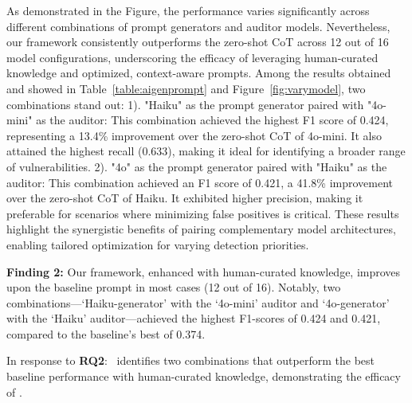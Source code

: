 As demonstrated in the Figure, the performance varies significantly across different combinations of prompt generators and auditor models.
Nevertheless, our framework consistently outperforms the zero-shot CoT across 12 out of 16 model configurations, underscoring the efficacy of leveraging human-curated knowledge and optimized, context-aware prompts. 
Among the results obtained and showed in Table~\ref{table:aigenprompt} and Figure~\ref{fig:varymodel}, two combinations stand out: 1). "Haiku" as the prompt generator paired with "4o-mini" as the auditor: This combination achieved the highest F1 score of 0.424, representing a 13.4\% improvement over the zero-shot CoT of 4o-mini. It also attained the highest recall (0.633), making it ideal for identifying a broader range of vulnerabilities.
2). "4o" as the prompt generator paired with "Haiku" as the auditor: This combination achieved an F1 score of 0.421, a 41.8\% improvement over the zero-shot CoT of Haiku. It exhibited higher precision, making it preferable for scenarios where minimizing false positives is critical.
These results highlight the synergistic benefits of pairing complementary model architectures, enabling tailored optimization for varying detection priorities.



\begin{tcolorbox}[colback=gray!20!white, colframe=gray!75!black, boxsep=5pt, arc=4pt, boxrule=1pt, left=0pt, right=0pt]
\textbf{Finding 2:} 
Our framework, enhanced with human-curated knowledge, improves upon the baseline prompt in most cases (12 out of 16). Notably, two combinations—‘Haiku-generator’ with the ‘4o-mini’ auditor and ‘4o-generator’ with the ‘Haiku’ auditor—achieved the highest F1-scores of 0.424 and 0.421, compared to the baseline's best of 0.374.
\end{tcolorbox}

\begin{tcolorbox}[colback=gray!20!white, colframe=gray!75!black, boxsep=5pt, arc=4pt, boxrule=1pt, left=0pt, right=0pt]
In response to \textbf{RQ2}: \tool~identifies two combinations that outperform the best baseline performance with human-curated knowledge, demonstrating the efficacy of \tool.
\end{tcolorbox}




